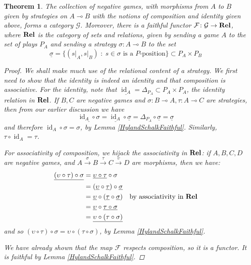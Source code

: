 \documentclass[11pt]{article} %
\theoremstyle{plain} %
\newtheorem{theorem}{Theorem}[section]
\theoremstyle{definition} %
\theoremstyle{note}
\theoremstyle{exercisestyle}
\newcommand{\catname}[1]{{\normalfont\textbf{#1}}}
\newcommand{\Rel}{\catname{Rel}}
\newcommand{\map}[3]{#2\xrightarrow{#1} #3}
\newcommand*\from{\colon}
\DeclareMathOperator{\id}{id}
\renewcommand{\implies}{\multimap}
\newcommand{\comp}[2]{#1 \circ #2}
\newcommand{\G}{\mathcal G}
\newcommand{\suchthat}{\;\colon\;}
\newcommand{\F}{\mathcal F}
\newcommand{\grel}[1]{\underline{#1}}
\begin{document}
\begin{theorem}
  \label{IsCategory}
  The collection of negative games, with morphisms from $A$ to $B$ given by strategies on $A\implies B$ with the notions of composition and identity given above, forms a category $\G$.  Moreover, there is a faithful functor $\F\from\G\to\Rel$, where $\Rel$ is the category of sets and relations, given by sending a game $A$ to the set of plays $P_A$ and sending a strategy $\sigma\from A\implies B$ to the set
  \[
    \grel{\sigma}=\{(s\vert_A,s\vert_B)\suchthat \textrm{$s\in\sigma$ is a $P$-position}\}\subset P_A\times P_B
    \]
  \begin{proof}
    We shall make much use of the relational content of a strategy.  We first need to show that the identity is indeed an identity and that composition is associative.  For the identity, note that $\grel{\id_A}=\Delta_{P_A}\subset P_A\times P_A$, the identity relation in $\Rel$.  If $B,C$ are negative games and $\sigma\colon B\implies A,\tau\colon A\implies C$ are strategies, then from our earlier discussion we have
    \[
      \grel{\comp{\id_A}{\sigma}}=\comp{\grel{\id_A}}{\grel\sigma}=\comp{\Delta_{P_A}}{\grel\sigma}=\grel\sigma
      \]
    and therefore $\comp{\id_A}{\sigma}=\sigma$, by Lemma \ref{HylandSchalkFaithful}.  Similarly, $\comp{\tau}{\id_A}=\tau$.  

    For associativity of composition, we hijack the associativity in $\Rel$: if $A,B,C,D$ are negative games, and $\map{\sigma}AB\xrightarrow{\tau}\map{\upsilon}CD$ are morphisms, then we have:
    \begin{align*}
      \grel{\comp{(\comp\upsilon\tau)}{\sigma}} & = \comp{\grel{\comp\upsilon\tau}}{\sigma} \\
        & = \comp{(\comp{\grel\upsilon}{\grel\tau})}{\grel\sigma} \\
        & = \comp{\grel\upsilon}{(\comp{\grel\tau}{\grel\sigma})} \quad\textrm{by associativity in $\Rel$} \\
        & = \comp{\grel\upsilon}{\grel{\comp\tau\sigma}} \\
        & = \grel{\comp{\upsilon}{(\comp\tau\sigma)}}
    \end{align*}
    and so $\comp{(\comp\upsilon\tau)}{\sigma}=\comp{\upsilon}{(\comp\tau\sigma)}$, by Lemma \ref{HylandSchalkFaithful}.  

    We have already shown that the map $\F$ respects composition, so it is a functor.  It is faithful by Lemma \ref{HylandSchalkFaithful}.
  \end{proof}
\end{theorem}
\end{document}
